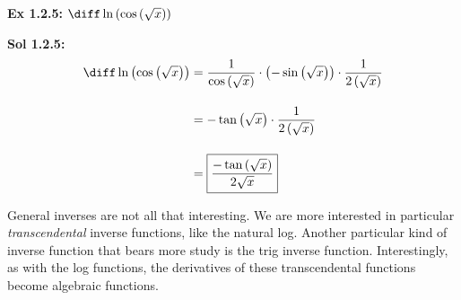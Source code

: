 \begin{tcolorbox}[example]
    \textbf{Ex 1.2.5: } $\diff \ln \left(\cos \left(\sqrt{x}\right)\right)$ 
\end{tcolorbox}
\begin{tcolorbox}[solution]
    \textbf{Sol 1.2.5: } \begin{align*}
        \diff \ln \left(\cos \left(\sqrt{x}\right)\right) & = \dfrac{1}{\cos \left(\sqrt{x}\right)} \cdot \left(-\sin \left(\sqrt{x}\right)\right) \cdot \dfrac{1}{2\left(\sqrt{x}\right)} \\[11pt]
        & = -\tan \left(\sqrt{x}\right) \cdot \dfrac{1}{2\left(\sqrt{x}\right)} \\[11pt]
        & = \boxed{\dfrac{-\tan \left(\sqrt{x}\right)}{2\sqrt{x}}}
    \end{align*}
\end{tcolorbox}

General inverses are not all that interesting. We are more interested in particular \textit{transcendental} inverse functions, like the natural log. Another particular kind of inverse function that bears more study is the trig inverse function. Interestingly, as with the log functions, the derivatives of these transcendental functions become algebraic functions. \par

\begin{center}
\end{center}

